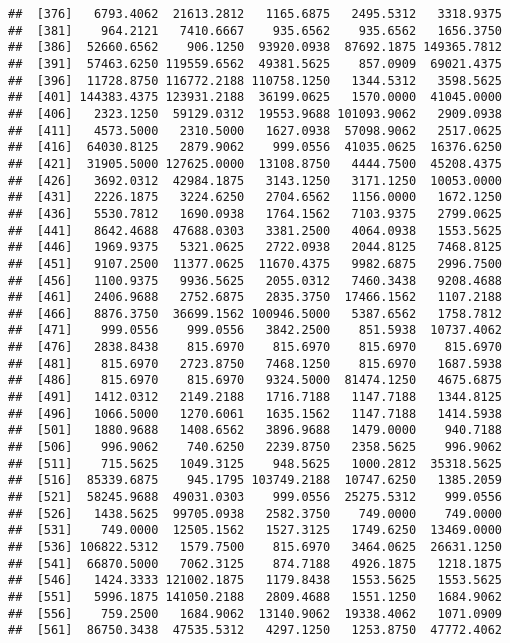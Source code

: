 \documentclass[]{article}
\begin{document}
\begin{verbatim}
##  [376]   6793.4062  21613.2812   1165.6875   2495.5312   3318.9375
##  [381]    964.2121   7410.6667    935.6562    935.6562   1656.3750
##  [386]  52660.6562    906.1250  93920.0938  87692.1875 149365.7812
##  [391]  57463.6250 119559.6562  49381.5625    857.0909  69021.4375
##  [396]  11728.8750 116772.2188 110758.1250   1344.5312   3598.5625
##  [401] 144383.4375 123931.2188  36199.0625   1570.0000  41045.0000
##  [406]   2323.1250  59129.0312  19553.9688 101093.9062   2909.0938
##  [411]   4573.5000   2310.5000   1627.0938  57098.9062   2517.0625
##  [416]  64030.8125   2879.9062    999.0556  41035.0625  16376.6250
##  [421]  31905.5000 127625.0000  13108.8750   4444.7500  45208.4375
##  [426]   3692.0312  42984.1875   3143.1250   3171.1250  10053.0000
##  [431]   2226.1875   3224.6250   2704.6562   1156.0000   1672.1250
##  [436]   5530.7812   1690.0938   1764.1562   7103.9375   2799.0625
##  [441]   8642.4688  47688.0303   3381.2500   4064.0938   1553.5625
##  [446]   1969.9375   5321.0625   2722.0938   2044.8125   7468.8125
##  [451]   9107.2500  11377.0625  11670.4375   9982.6875   2996.7500
##  [456]   1100.9375   9936.5625   2055.0312   7460.3438   9208.4688
##  [461]   2406.9688   2752.6875   2835.3750  17466.1562   1107.2188
##  [466]   8876.3750  36699.1562 100946.5000   5387.6562   1758.7812
##  [471]    999.0556    999.0556   3842.2500    851.5938  10737.4062
##  [476]   2838.8438    815.6970    815.6970    815.6970    815.6970
##  [481]    815.6970   2723.8750   7468.1250    815.6970   1687.5938
##  [486]    815.6970    815.6970   9324.5000  81474.1250   4675.6875
##  [491]   1412.0312   2149.2188   1716.7188   1147.7188   1344.8125
##  [496]   1066.5000   1270.6061   1635.1562   1147.7188   1414.5938
##  [501]   1880.9688   1408.6562   3896.9688   1479.0000    940.7188
##  [506]    996.9062    740.6250   2239.8750   2358.5625    996.9062
##  [511]    715.5625   1049.3125    948.5625   1000.2812  35318.5625
##  [516]  85339.6875    945.1795 103749.2188  10747.6250   1385.2059
##  [521]  58245.9688  49031.0303    999.0556  25275.5312    999.0556
##  [526]   1438.5625  99705.0938   2582.3750    749.0000    749.0000
##  [531]    749.0000  12505.1562   1527.3125   1749.6250  13469.0000
##  [536] 106822.5312   1579.7500    815.6970   3464.0625  26631.1250
##  [541]  66870.5000   7062.3125    874.7188   4926.1875   1218.1875
##  [546]   1424.3333 121002.1875   1179.8438   1553.5625   1553.5625
##  [551]   5996.1875 141050.2188   2809.4688   1551.1250   1684.9062
##  [556]    759.2500   1684.9062  13140.9062  19338.4062   1071.0909
##  [561]  86750.3438  47535.5312   4297.1250   1253.8750  47772.4062

\end{verbatim}
\end{document}
